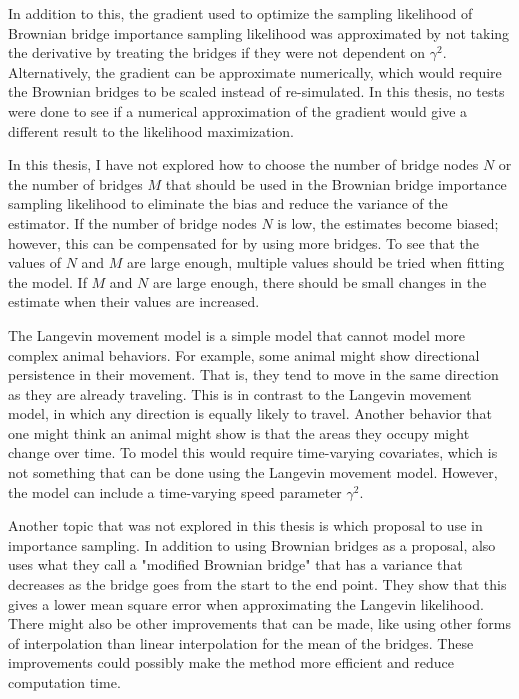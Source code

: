In addition to this, the gradient used to optimize the sampling likelihood of Brownian bridge importance sampling likelihood was approximated by not taking the derivative by treating the bridges if they were not dependent on $\gamma^2$. Alternatively, the gradient can be approximate numerically, which would require the Brownian bridges to be scaled instead of re-simulated. In this thesis, no tests were done to see if a numerical approximation of the gradient would give a different result to the likelihood maximization.


In this thesis, I have not explored how to choose the number of bridge nodes $N$ or the number of bridges $M$ that should be used in the Brownian bridge importance sampling likelihood to eliminate the bias and reduce the variance of the estimator. If the number of bridge nodes $N$ is low, the estimates become biased; however, this can be compensated for by using more bridges. To see that the values of $N$ and $M$ are large enough, multiple values should be tried when fitting the model. If $M$ and $N$ are large enough, there should be small changes in the estimate when their values are increased. 


The Langevin movement model is a simple model that cannot model more complex animal behaviors. For example, some animal might show directional persistence in their movement. That is, they tend to move in the same direction as they are already traveling. This is in contrast to the Langevin movement model, in which any direction is equally likely to travel. Another behavior that one might think an animal might show is that the areas they occupy might change over time. To model this would require time-varying covariates, which is not something that can be done using the Langevin movement model. However, the model can include a time-varying speed parameter $\gamma^2$\parencite{michelot_langevin_2019}.


Another topic that was not explored in this thesis is which proposal to use in importance sampling. In addition to using Brownian bridges as a proposal, \textcite{durham_numerical_2002} also uses what they call a "modified Brownian bridge" that has a variance that decreases as the bridge goes from the start to the end point. They show that this gives a lower mean square error when approximating the Langevin likelihood. There might also be other improvements that can be made, like using other forms of interpolation than linear interpolation for the mean of the bridges. These improvements could possibly make the method more efficient and reduce computation time.

